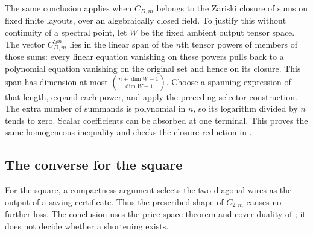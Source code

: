 \begin{remark}
The same conclusion applies when $C_{D,m}$ belongs to the Zariski closure of sums on fixed finite layouts, over an algebraically closed field. To justify this without continuity of a spectral point, let $W$ be the fixed ambient output tensor space. The vector $C_{D,m}^{\otimes n}$ lies in the linear span of the $n$th tensor powers of members of those sums: every linear equation vanishing on these powers pulls back to a polynomial equation vanishing on the original set and hence on its closure. This span has dimension at most $\binom{n+\dim W-1}{\dim W-1}$. Choose a spanning expression of that length, expand each power, and apply the preceding selector construction. The extra number of summands is polynomial in $n$, so its logarithm divided by $n$ tends to zero. Scalar coefficients can be absorbed at one terminal. This proves the same homogeneous inequality and checks the closure reduction in \cite[Section 2]{OpenAI2026}.
\end{remark}

\subsection{The converse for the square}
For the square, a compactness argument selects the two diagonal wires as the output of a saving certificate. Thus the prescribed shape of $C_{2,m}$ causes no further loss. The conclusion uses the price-space theorem and cover duality of \cite[Proposition C.3 and Theorem A.6]{Anthropic2026}; it does not decide whether a shortening exists.

